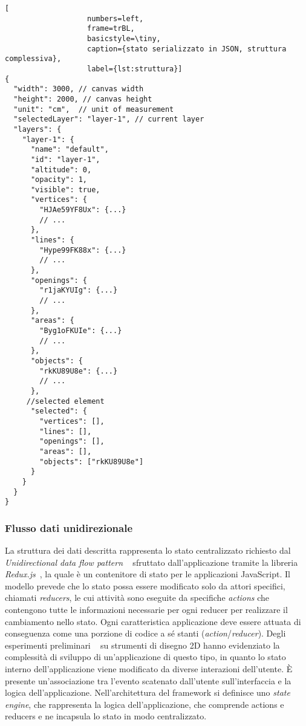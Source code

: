 \begin{lstlisting}[
                   numbers=left,
                   frame=trBL,
                   basicstyle=\tiny,
                   caption={stato serializzato in JSON, struttura complessiva},
                   label={lst:struttura}]
{
  "width": 3000, // canvas width
  "height": 2000, // canvas height
  "unit": "cm",  // unit of measurement
  "selectedLayer": "layer-1", // current layer
  "layers": {
    "layer-1": {
      "name": "default",
      "id": "layer-1",
      "altitude": 0,
      "opacity": 1,
      "visible": true,
      "vertices": {
        "HJAe59YF8Ux": {...}
        // ...
      },
      "lines": {
        "Hype99FK88x": {...}
        // ...
      },
      "openings": {
        "r1jaKYUIg": {...}
        // ...
      },
      "areas": {
        "Byg1oFKUIe": {...}
        // ...
      },
      "objects": {
        "rkKU89U8e": {...}
        // ...
      },
     //selected element
      "selected": {
        "vertices": [],
        "lines": [],
        "openings": [],
        "areas": [],
        "objects": ["rkKU89U8e"]
      }
    }
  }
}
\end{lstlisting}
\newpage

\subsubsection*{Flusso dati unidirezionale}
\noindent
La struttura dei dati descritta rappresenta lo stato centralizzato richiesto dal \emph{Unidirectional data flow pattern}
~\cite{uniflow} sfruttato dall'applicazione tramite la libreria \emph{Redux.js}~\cite{redux},
la quale è un contenitore di stato per le applicazioni JavaScript.
Il modello prevede che lo stato possa essere modificato solo da attori specifici, chiamati \emph{reducers},
le cui attività sono eseguite da specifiche \emph{actions} che contengono tutte le informazioni necessarie per
ogni reducer per realizzare il cambiamento nello stato. Ogni caratteristica applicazione deve essere attuata di conseguenza
come una porzione di codice a sé stanti (\emph{action}/\emph{reducer}).
Degli esperimenti preliminari ~\cite{walle} su strumenti di disegno 2D
hanno evidenziato la complessità di sviluppo di un'applicazione di questo tipo, in quanto
lo stato interno dell'applicazione viene modificato da diverse interazioni dell'utente.
\`E presente un'associazione tra l'evento scatenato dall'utente sull'interfaccia e la logica dell'applicazione.
Nell'architettura del framework si definisce uno \emph{state engine}, che rappresenta la logica dell'applicazione,
che comprende actions e reducers e ne incapsula lo stato in modo centralizzato.
\newpage

